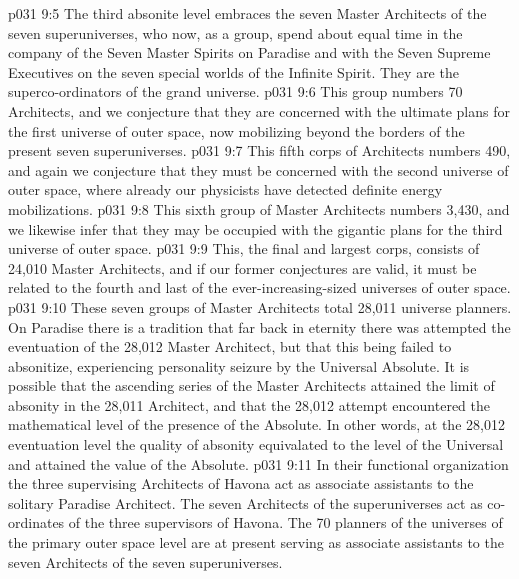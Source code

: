 \vs p031 9:5 \bibnobreakspace {} The third absonite level embraces the seven Master Architects of the seven superuniverses, who now, as a group, spend about equal time in the company of the Seven Master Spirits on Paradise and with the Seven Supreme Executives on the seven special worlds of the Infinite Spirit. They are the superco\hyp{}ordinators of the grand universe.
\vs p031 9:6 \bibnobreakspace {} This group numbers 70 Architects, and we conjecture that they are concerned with the ultimate plans for the first universe of outer space, now mobilizing beyond the borders of the present seven superuniverses.
\vs p031 9:7 \bibnobreakspace {} This fifth corps of Architects numbers 490, and again we conjecture that they must be concerned with the second universe of outer space, where already our physicists have detected definite energy mobilizations.
\vs p031 9:8 \bibnobreakspace {} This sixth group of Master Architects numbers 3,430, and we likewise infer that they may be occupied with the gigantic plans for the third universe of outer space.
\vs p031 9:9 \bibnobreakspace {} This, the final and largest corps, consists of 24,010 Master Architects, and if our former conjectures are valid, it must be related to the fourth and last of the ever\hyp{}increasing\hyp{}sized universes of outer space.
\vs p031 9:10 \pc These seven groups of Master Architects total 28,011 universe planners. On Paradise there is a tradition that far back in eternity there was attempted the eventuation of the 28,012 Master Architect, but that this being failed to absonitize, experiencing personality seizure by the Universal Absolute. It is possible that the ascending series of the Master Architects attained the limit of absonity in the 28,011 Architect, and that the 28,012 attempt encountered the mathematical level of the presence of the Absolute. In other words, at the 28,012 eventuation level the quality of absonity equivalated to the level of the Universal and attained the value of the Absolute.
\vs p031 9:11 \pc In their functional organization the three supervising Architects of Havona act as associate assistants to the solitary Paradise Architect. The seven Architects of the superuniverses act as co\hyp{}ordinates of the three supervisors of Havona. The 70 planners of the universes of the primary outer space level are at present serving as associate assistants to the seven Architects of the seven superuniverses.
